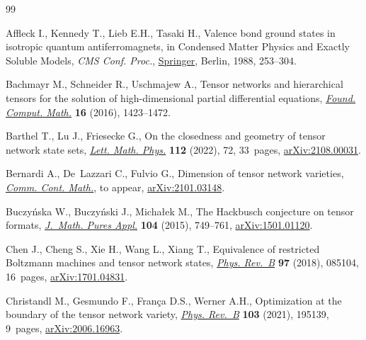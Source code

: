 \documentclass[pdftex]{sigma}
\numberwithin{equation}{section}
\begin{document}
\begin{thebibliography}{99}
\footnotesize\itemsep=0pt

Affleck I., Kennedy T., Lieb E.H., Tasaki H., Valence bond ground states in
  isotropic quantum antiferromagnets, in Condensed Matter Physics and Exactly
  Soluble Models, \textit{CMS Conf. Proc.}, \href{https://doi.org/10.1007/978-3-662-06390-3_19}{Springer}, Berlin, 1988, 253--304.

Bachmayr M., Schneider R., Uschmajew A., Tensor networks and hierarchical
  tensors for the solution of high-dimensional partial differential equations,
  \href{https://doi.org/10.1007/s10208-016-9317-9}{\textit{Found. Comput. Math.}} \textbf{16} (2016), 1423--1472.

Barthel T., Lu J., Friesecke G., On the closedness and geometry of tensor
  network state sets, \href{https://doi.org/10.1007/s11005-022-01552-z}{\textit{Lett. Math. Phys.}} \textbf{112} (2022), 72,
  33~pages, \href{https://arxiv.org/abs/2108.00031}{arXiv:2108.00031}.

Bernardi A., De~Lazzari C., Fulvio G., Dimension of tensor network varieties,
  \href{https://doi.org/10.1142/S0219199722500596}{\textit{Comm. Cont. Math.}}, {t}o appear, \href{https://arxiv.org/abs/2101.03148}{arXiv:2101.03148}.

Buczy\'nska W., Buczy\'nski J., Micha{\l}ek M., The {H}ackbusch conjecture on
  tensor formats, \href{https://doi.org/10.1016/j.matpur.2015.05.002}{\textit{J.~Math. Pures Appl.}} \textbf{104} (2015), 749--761,
  \href{https://arxiv.org/abs/1501.01120}{arXiv:1501.01120}.

Chen J., Cheng S., Xie H., Wang L., Xiang T., Equivalence of restricted
  Boltzmann machines and tensor network states, \href{https://doi.org/10.1103/PhysRevB.97.085104}{\textit{Phys. Rev.~B}}
  \textbf{97} (2018), 085104, 16~pages, \href{https://arxiv.org/abs/1701.04831}{arXiv:1701.04831}.

Christandl M., Gesmundo F., Fran{\c{c}}a D.S., Werner A.H., Optimization at the
  boundary of the tensor network variety, \href{https://doi.org/10.1103/PhysRevB.103.195139}{\textit{Phys. Rev.~B}} \textbf{103}
  (2021), 195139, 9~pages, \href{https://arxiv.org/abs/2006.16963}{arXiv:2006.16963}.


\end{thebibliography}
\end{document}
